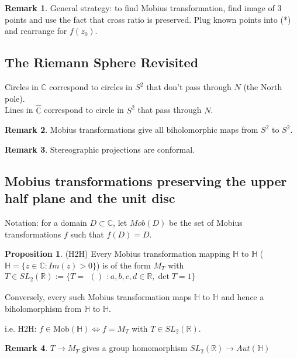\documentclass[12pt,a4paper]{article}
\theoremstyle{definition}
\newtheorem{proposition}[definition]{Proposition}
\newtheorem*{remark}{Remark}
\begin{document}
\begin{remark}
	General strategy: to find Mobius transformation, find image of 3 points and use the fact that cross ratio is preserved. Plug known points into (*) and rearrange for $f(z_0)$.
\end{remark}

\subsection{The Riemann Sphere Revisited}

Circles in $\hat{\mathbb{C}}$ correspond to circles in $S^2$ that don't pass through $N$ (the North pole).
\\
Lines in $\hat{\mathbb{C}}$ correspond to circle in $S^2$ that pass through $N$.

\begin{remark}
	Mobius transformations give all biholomorphic maps from $S^2$ to $S^2$.
\end{remark}

\begin{remark}
	Stereographic projections are conformal.
\end{remark}

\subsection{Mobius transformations preserving the upper half plane and the unit disc}

Notation: for a domain $D \subset \mathbb{C}$, let $Mob(D)$ be the set of Mobius transformations $f$ such that $f(D) = D$.

\begin{proposition}
	(H2H) Every Mobius transformation mapping $\mathbb{H}$ to $\mathbb{H}$ ($\mathbb{H} = \{ z \in \mathbb{C}: Im(z) > 0\}$) is of the form $M_T$ with $T \in SL_2 (\mathbb{R}) := \{T = \begin{matrix}
		()
	\end{matrix}: a, b, c, d \in \mathbb{R}, \det T = 1\}$
	
	Conversely, every such Mobius transformation maps $\mathbb{H}$ to $\mathbb{H}$ and hence a biholomorphism from $\mathbb{H}$ to $\mathbb{H}$.

	i.e. H2H: $f \in \text{Mob}(\mathbb{H}) \Leftrightarrow f = M_T$ with $T \in SL_2 (\mathbb{R})$.
\end{proposition}

\begin{remark}
	$T \rightarrow M_T$ gives a group homomorphism $SL_2 (\mathbb{R}) \rightarrow Aut(\mathbb{H})$
\end{remark}
\end{document}
